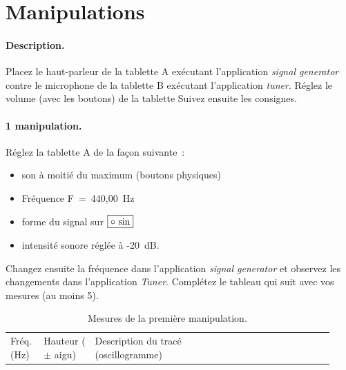 \documentclass[12pt,a4paper,notitlepage]{article}
\begin{document}
\section{Manipulations}
\begin{multicols}{2}
\paragraph{Description.}
Placez le haut-parleur de la tablette A exécutant l'application \emph{signal generator\/} contre le microphone de la tablette B exécutant l'application \emph{tuner\/}. 
Réglez le volume (avec les boutons) de la tablette 
Suivez ensuite les consignes.
\columnbreak

\begin{figure}
	\centering
\end{figure}
\end{multicols}

\paragraph{1\iere{} manipulation.}
Réglez la tablette A de la façon suivante~:
\begin{itemize}
	\item son à moitié du maximum (boutons physiques)
	\item Fréquence F~=~440,00~Hz
	\item forme du signal sur $\boxed{\circ ~ \rm sin}$
	\item intensité sonore réglée à -20~dB.
\end{itemize}
Changez ensuite la fréquence dans l'application \emph{signal generator\/} et observez les changements dans l'application \emph{Tuner\/}. 
Complétez le tableau qui suit avec vos mesures (au moins 5).
\begin{table}
	\centering
	\caption{Mesures de la première manipulation.}
	\renewcommand*{\arraystretch}{1.45}
	\begin{tabular}{| m{0.11\linewidth} | m{0.18\linewidth} | m{0.64\linewidth} |}
		\hline
		Fréq. (Hz) & Hauteur ($\pm$ aigu) & Description du tracé (oscillogramme) \cr
		\hline
		& & \cr
		\hline
		& & \cr
		\hline
		& & \cr
		\hline
		& & \cr
		\hline
		& & \cr
		\hline
	\end{tabular}
\end{table}
\end{document}
